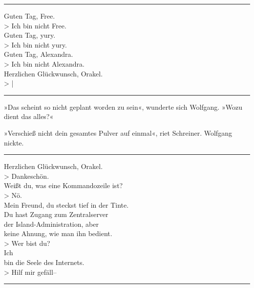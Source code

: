 \noindent \parbox{\textwidth}{ \vspace{3ex} \hrule \vspace{3ex}

    \begin{tiny}
    \begin{ttfamily}

\noindent Guten Tag, Free.\\
\noindent > Ich bin nicht Free.\\
\noindent Guten Tag, yury.\\
\noindent > Ich bin nicht yury.\\
\noindent Guten Tag, Alexandra.\\
\noindent > Ich bin nicht Alexandra.\\
\noindent Herzlichen Glückwunsch, Orakel.\\
\noindent > |

    \end{ttfamily}
    \end{tiny}

\vspace{3ex} \hrule \vspace{3ex} }

»Das scheint so nicht geplant worden zu sein«, wunderte sich Wolfgang. »Wozu dient das alles?«

»Verschieß nicht dein gesamtes Pulver auf einmal«, riet Schreiner. Wolfgang nickte.

\noindent \parbox{\textwidth}{ \vspace{3ex} \hrule \vspace{3ex}

    \begin{tiny}
    \begin{ttfamily}

\noindent Herzlichen Glückwunsch, Orakel.\\
\noindent > Dankeschön.\\
\noindent Weißt du, was eine Kommandozeile ist?\\
\noindent > Nö.\\
\noindent Mein Freund, du steckst tief in der Tinte.\\
\noindent Du hast Zugang zum Zentralserver\\
\noindent der Island-Administration, aber\\
\noindent keine Ahnung, wie man ihn bedient.\\
\noindent > Wer bist du?\\
\noindent Ich\\
\noindent bin die Seele des Internets.\\
\noindent > Hilf mir gefäll–

    \end{ttfamily}
    \end{tiny}

\vspace{3ex} \hrule \vspace{3ex} }

